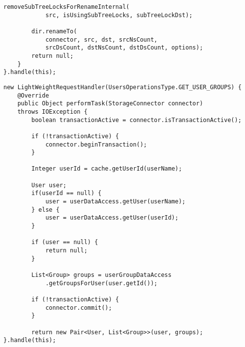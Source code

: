 \begin{lstlisting}[label={lst:trh}, caption={Transactional request handler for the rename operation}]
        removeSubTreeLocksForRenameInternal(
            src, isUsingSubTreeLocks, subTreeLockDst);

        dir.renameTo(
            connector, src, dst, srcNsCount,
            srcDsCount, dstNsCount, dstDsCount, options);
        return null;
    }
}.handle(this);
\end{lstlisting}

\begin{lstlisting}[label={lst:lrh}, caption={Lightweight request handler}]
new LightWeightRequestHandler(UsersOperationsType.GET_USER_GROUPS) {
    @Override
    public Object performTask(StorageConnector connector)
    throws IOException {
        boolean transactionActive = connector.isTransactionActive();

        if (!transactionActive) {
            connector.beginTransaction();
        }

        Integer userId = cache.getUserId(userName);
        
        User user;
        if(userId == null) {
            user = userDataAccess.getUser(userName);
        } else {
            user = userDataAccess.getUser(userId);
        }

        if (user == null) {
            return null;
        }

        List<Group> groups = userGroupDataAccess
            .getGroupsForUser(user.getId());

        if (!transactionActive) {
            connector.commit();
        }

        return new Pair<User, List<Group>>(user, groups);
}.handle(this);
\end{lstlisting}